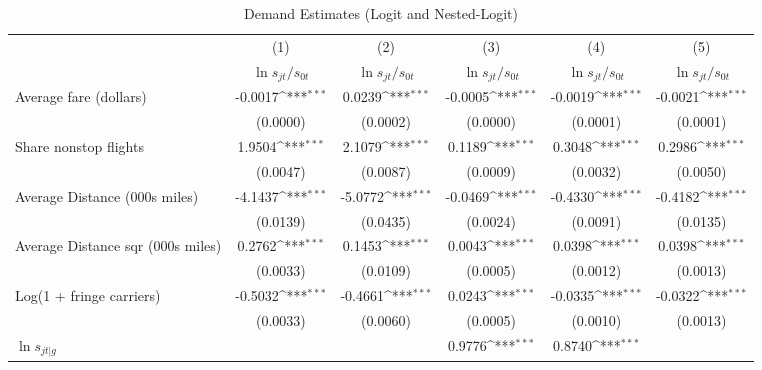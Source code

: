 \begin{table}[htbp]\centering
\def\sym#1{\ifmmode^{#1}\else\(^{#1}\)\fi}
\caption{Demand Estimates (Logit and Nested-Logit)}
\begin{tabular}{l*{5}{c}}
\toprule
                    &\multicolumn{1}{c}{(1)}&\multicolumn{1}{c}{(2)}&\multicolumn{1}{c}{(3)}&\multicolumn{1}{c}{(4)}&\multicolumn{1}{c}{(5)}\\
                    &\multicolumn{1}{c}{$\ln s_{jt}/s_{0t}$}&\multicolumn{1}{c}{$\ln s_{jt}/s_{0t}$}&\multicolumn{1}{c}{$\ln s_{jt}/s_{0t}$}&\multicolumn{1}{c}{$\ln s_{jt}/s_{0t}$}&\multicolumn{1}{c}{$\ln s_{jt}/s_{0t}$}\\
\midrule
Average fare (dollars)&     -0.0017\sym{***}&      0.0239\sym{***}&     -0.0005\sym{***}&     -0.0019\sym{***}&     -0.0021\sym{***}\\
                    &    (0.0000)         &    (0.0002)         &    (0.0000)         &    (0.0001)         &    (0.0001)         \\
\addlinespace
Share nonstop flights &      1.9504\sym{***}&      2.1079\sym{***}&      0.1189\sym{***}&      0.3048\sym{***}&      0.2986\sym{***}\\
                    &    (0.0047)         &    (0.0087)         &    (0.0009)         &    (0.0032)         &    (0.0050)         \\
\addlinespace
Average Distance (000s miles)&     -4.1437\sym{***}&     -5.0772\sym{***}&     -0.0469\sym{***}&     -0.4330\sym{***}&     -0.4182\sym{***}\\
                    &    (0.0139)         &    (0.0435)         &    (0.0024)         &    (0.0091)         &    (0.0135)         \\
\addlinespace
Average Distance sqr (000s miles)&      0.2762\sym{***}&      0.1453\sym{***}&      0.0043\sym{***}&      0.0398\sym{***}&      0.0398\sym{***}\\
                    &    (0.0033)         &    (0.0109)         &    (0.0005)         &    (0.0012)         &    (0.0013)         \\
\addlinespace
Log(1 + fringe carriers)&     -0.5032\sym{***}&     -0.4661\sym{***}&      0.0243\sym{***}&     -0.0335\sym{***}&     -0.0322\sym{***}\\
                    &    (0.0033)         &    (0.0060)         &    (0.0005)         &    (0.0010)         &    (0.0013)         \\
\addlinespace
$\ln s_{jt|g}$      &                     &                     &      0.9776\sym{***}&      0.8740\sym{***}&                     \\

\end{tabular}
\end{table}
